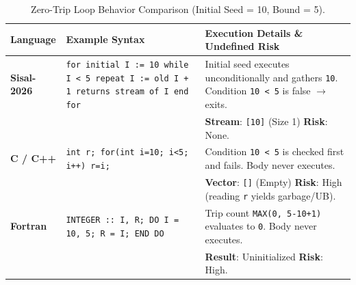 \begin{table}[h!]
\centering
\small
\begin{tabularx}{\textwidth}{l >{\raggedright\arraybackslash}p{4.2cm} >{\raggedright\arraybackslash}X}
\toprule
\textbf{Language} & \textbf{Example Syntax} & \textbf{Execution Details \& Undefined Risk} \\
\midrule
\textbf{Sisal-2026} & \texttt{for initial I := 10 while I < 5 repeat I := old I + 1 returns stream of I end for} & Initial seed executes unconditionally and gathers \texttt{10}. Condition \texttt{10 < 5} is false $\rightarrow$ exits. \\
\addlinespace
& & \textbf{Stream}: \texttt{[10]} (Size 1) \quad \textbf{Risk}: None. \\
\midrule
\textbf{C / C++} & \texttt{int r; for(int i=10; i<5; i++) r=i;} & Condition \texttt{10 < 5} is checked first and fails. Body never executes. \\
\addlinespace
& & \textbf{Vector}: \texttt{[]} (Empty) \quad \textbf{Risk}: High (reading \texttt{r} yields garbage/UB). \\
\midrule
\textbf{Fortran} & \texttt{INTEGER :: I, R; DO I = 10, 5; R = I; END DO} & Trip count \texttt{MAX(0, 5-10+1)} evaluates to \texttt{0}. Body never executes. \\
\addlinespace
& & \textbf{Result}: Uninitialized \quad \textbf{Risk}: High. \\
\bottomrule
\end{tabularx}
\caption{Zero-Trip Loop Behavior Comparison (Initial Seed = 10, Bound = 5).}
\label{tab:loop_comparison_zero_trip}
\end{table}

